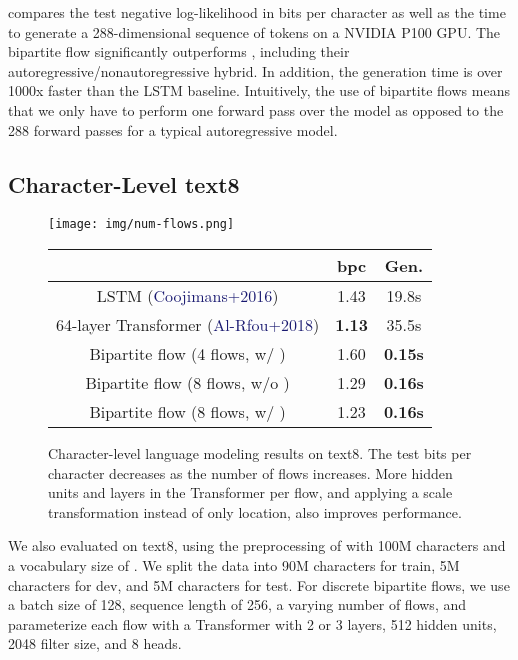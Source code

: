 \documentclass{article}
\newcommand{\blue}[1]{\textcolor{MidnightBlue}{#1}}
\begin{document}
 compares the test negative log-likelihood in bits per character as well as the time to generate a 288-dimensional sequence of tokens on a NVIDIA P100 GPU. The bipartite flow significantly outperforms \citet{ziegler2019latent}, including their autoregressive/nonautoregressive hybrid. In addition, the generation time is over 1000x faster than the LSTM baseline. Intuitively, the use of bipartite flows means that we only have to perform one forward pass over the model as opposed to the 288 forward passes for a typical autoregressive model.

\subsection{Character-Level text8}
\begin{figure}[t!]
\centering
\begin{minipage}{0.45\textwidth}
\centering
\texttt{[image: img/num-flows.png]}
\end{minipage}\hfill \begin{minipage}{0.54\textwidth}
\centering
\begin{tabular}{ccc}
\\  \toprule
& bpc & Gen. \\ \midrule
LSTM
(\blue{Coojimans+2016})
& 1.43 &  19.8s \\
64-layer Transformer
(\blue{Al-Rfou+2018})
&  \textbf{1.13} & 35.5s \\
Bipartite flow (4 flows, w/ ) & 1.60 & \textbf{0.15s} \\
Bipartite flow (8 flows, w/o ) & 1.29 & \textbf{0.16s} \\
Bipartite flow (8 flows, w/ ) & 1.23 & \textbf{0.16s} \\
\bottomrule
\end{tabular}
\end{minipage}
\caption{Character-level language modeling results on text8. The test bits per character decreases as the number of flows increases. More hidden units  and layers  in the Transformer per flow, and applying a scale transformation instead of only location, also improves performance.
}
\label{fig:text8}
\end{figure}

We also evaluated on text8, using the preprocessing of \citet{mikolov2012subword,zhang2016architectural} with 100M characters and a vocabulary size of . We split the data into 90M characters for train, 5M characters for dev, and 5M characters for test. For discrete bipartite flows, we use a batch size of 128, sequence length of 256, a varying number of flows, and parameterize each flow with a Transformer with 2 or 3 layers, 512 hidden units, 2048 filter size, and 8 heads.
\end{document}
